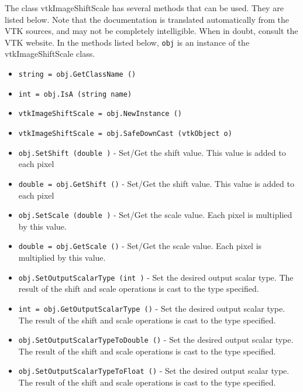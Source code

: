 The class vtkImageShiftScale has several methods that can be used.
  They are listed below.
Note that the documentation is translated automatically from the VTK sources,
and may not be completely intelligible.  When in doubt, consult the VTK website.
In the methods listed below, \verb|obj| is an instance of the vtkImageShiftScale class.
\begin{itemize}
\item  \verb|string = obj.GetClassName ()|

\item  \verb|int = obj.IsA (string name)|

\item  \verb|vtkImageShiftScale = obj.NewInstance ()|

\item  \verb|vtkImageShiftScale = obj.SafeDownCast (vtkObject o)|

\item  \verb|obj.SetShift (double )| -  Set/Get the shift value. This value is added to each pixel

\item  \verb|double = obj.GetShift ()| -  Set/Get the shift value. This value is added to each pixel

\item  \verb|obj.SetScale (double )| -  Set/Get the scale value. Each pixel is multiplied by this value.

\item  \verb|double = obj.GetScale ()| -  Set/Get the scale value. Each pixel is multiplied by this value.

\item  \verb|obj.SetOutputScalarType (int )| -  Set the desired output scalar type. The result of the shift 
 and scale operations is cast to the type specified.

\item  \verb|int = obj.GetOutputScalarType ()| -  Set the desired output scalar type. The result of the shift 
 and scale operations is cast to the type specified.

\item  \verb|obj.SetOutputScalarTypeToDouble ()| -  Set the desired output scalar type. The result of the shift 
 and scale operations is cast to the type specified.

\item  \verb|obj.SetOutputScalarTypeToFloat ()| -  Set the desired output scalar type. The result of the shift 
 and scale operations is cast to the type specified.


\end{itemize}
